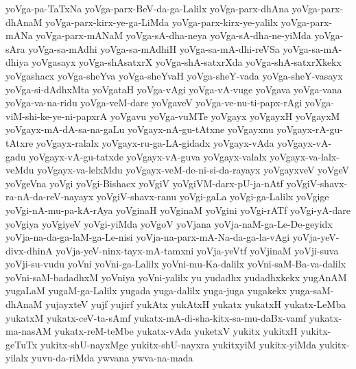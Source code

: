 {yoVga-pa-TaTxNa
yoVga-parx-BeV-da-ga-Lalilx
yoVga-parx-dhAna
yoVga-parx-dhAnaM
yoVga-parx-kirx-ye-ga-LiMda
yoVga-parx-kirx-ye-yalilx
yoVga-parx-mANa
yoVga-parx-mANaM
yoVga-sA-dha-neya
yoVga-sA-dha-ne-yiMda
yoVga-sAra
yoVga-sa-mAdhi
yoVga-sa-mAdhiH
yoVga-sa-mA-dhi-reVSa
yoVga-sa-mA-dhiya
yoVgasayx
yoVga-shAsatxrX
yoVga-shA-satxrXda
yoVga-shA-satxrXkekx
yoVgashacx
yoVga-sheYva
yoVga-sheYvaH
yoVga-sheY-vada
yoVga-sheY-vasayx
yoVga-si-dAdhxMta
yoVgataH
yoVga-vAgi
yoVga-vA-vuge
yoVgava
yoVga-vana
yoVga-va-na-ridu
yoVga-veM-dare
yoVgaveV
yoVga-ve-nu-ti-papx-rAgi
yoVga-viM-shi-ke-ye-ni-papxrA
yoVgavu
yoVga-vuMTe
yoVgayx
yoVgayxH
yoVgayxM
yoVgayx-mA-dA-sa-na-gaLu
yoVgayx-nA-gu-tAtxne
yoVgayxnu
yoVgayx-rA-gu-tAtxre
yoVgayx-ralalx
yoVgayx-ru-ga-LA-gidadx
yoVgayx-vAda
yoVgayx-vA-gadu
yoVgayx-vA-gu-tatxde
yoVgayx-vA-guva
yoVgayx-valalx
yoVgayx-va-lalx-veMdu
yoVgayx-va-lelxMdu
yoVgayx-veM-de-ni-si-da-rayayx
yoVgayxveV
yoVgeV
yoVgeVna
yoVgi
yoVgi-Bishacx
yoVgiV
yoVgiVM-darx-pU-ja-nAtf
yoVgiV-shavx-ra-nA-da-reV-nayayx
yoVgiV-shavx-ranu
yoVgi-gaLa
yoVgi-ga-Lalilx
yoVgige
yoVgi-nA-mu-pa-kA-rAya
yoVginaH
yoVginaM
yoVgini
yoVgi-rATf
yoVgi-yA-dare
yoVgiya
yoVgiyeV
yoVgi-yiMda
yoVgoV
yoVjana
yoVja-naM-ga-Le-De-geyidx
yoVja-na-da-ga-laM-ga-Le-nisi
yoVja-na-parx-mA-Na-da-ga-la-vAgi
yoVja-yeV-divx-dhinA
yoVja-yeV-ninx-tayx-mA-tamxni
yoVja-yeVtf
yoVjinaM
yoVji-suva
yoVji-su-vudu
yoVni
yoVni-ga-Lalilx
yoVni-mu-Ka-dalilx
yoVni-saM-Ba-va-dalilx
yoVni-saM-badadhxM
yoVniya
yoVni-yalilx
yu
yudadhx
yudadhxkekx
yugAnAM
yugaLaM
yugaM-ga-Lalilx
yugada
yuga-dalilx
yuga-juga
yugakekx
yuga-saM-dhAnaM
yujayxteV
yujf
yujirf
yukAtx
yukAtxH
yukatx
yukatxH
yukatx-LeMba
yukatxM
yukatx-ceV-ta-sAmf
yukatx-mA-di-sha-kitx-sa-mu-daBx-vamf
yukatx-ma-nasAM
yukatx-reM-teMbe
yukatx-vAda
yuketxV
yukitx
yukitxH
yukitx-geTuTx
yukitx-shU-nayxMge
yukitx-shU-nayxra
yukitxyiM
yukitx-yiMda
yukitx-yilalx
yuvu-da-riMda
ywvana
ywva-na-mada
}

